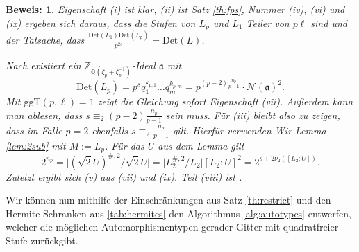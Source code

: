 \documentclass[12pt,a4paper,halfparskip,headsepline,bibtotocnumbered]{scrreprt}
\theoremstyle{nummermitklammern}
\theoremstyle{nonumberbreak}
\newtheorem{beweis}{Beweis:}
\newcommand{\Z}{\mathbb{Z}}
\newcommand{\Q}{\mathbb{Q}}
\newcommand{\No}{\mathcal{N}}
\newcommand{\Det}{\text{Det}}
\renewcommand{\a}{\mathfrak{a}}
\newcommand{\ggT}{\text{ggT}}
\begin{document}
\begin{beweis}
	Eigenschaft (i) ist klar, (ii) ist Satz \eqref{th:fps}, Nummer (iv), (vi) und (ix) ergeben sich daraus, dass die Stufen von $L_p$ und $L_1$ Teiler von $p \ell$ sind und der Tatsache, dass $\frac{\Det(L_1) \Det(L_p)}{p^{2s}} = \Det(L)$.\par
	Nach \cite[Satz (3.1.4)(d) und Lemma (3.1.1)]{juergens} existiert ein $\Z_{\Q(\zeta_p + \zeta_p^{-1})}$-Ideal $\a$ mit
	\begin{equation*}
		\Det(L_p) = p^s q_1^{k_{p,1}} \dots q_m^{k_{p,m}} = p^{(p-2)\frac{n_p}{p-1}} \cdot \No(\a)^2.
	\end{equation*}
	Mit $\ggT(p, \ell) = 1$ zeigt die Gleichung sofort Eigenschaft (vii). Außerdem kann man ablesen, dass $s \equiv_2 (p-2)\frac{n_p}{p-1}$ sein muss. Für (iii) bleibt also zu zeigen, dass im Falle $p=2$ ebenfalls $s \equiv_2 \frac{n_p}{p-1}$ gilt. Hierfür verwenden Wir Lemma \eqref{lem:2sub} mit $M := L_p$. Für das $U$ aus dem Lemma gilt
	\begin{equation*}
		2^{n_p} = \vert (\sqrt{2}U)^{\#,2} / \sqrt{2} U \vert = \vert L_2^{\#,2} / L_2 \vert [L_2 : U]^2 = 2^{s + 2 \nu_2([L_2 : U])}.
	\end{equation*}
	Zuletzt ergibt sich (v) aus (vii) und (ix). Teil (viii) ist \cite[Korollar (4.1.9)]{juergens}.
\end{beweis}

Wir können nun mithilfe der Einschränkungen aus Satz \eqref{th:restrict} und den Hermite-Schranken aus \eqref{tab:hermites} den Algorithmus \eqref{alg:autotypes} entwerfen, welcher die möglichen Automorphismentypen gerader Gitter mit quadratfreier Stufe zurückgibt.
\end{document}
